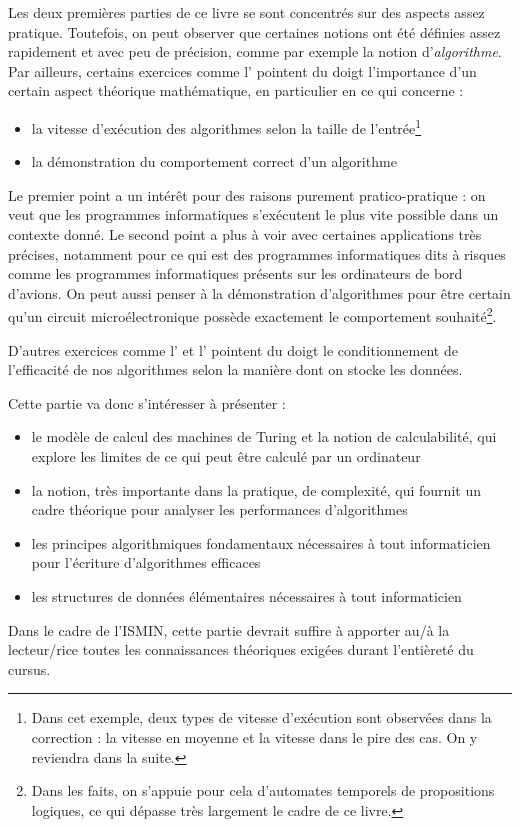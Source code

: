 \documentclass[../../main.tex]{subfiles}
\begin{document}
Les deux premières parties de ce livre se sont concentrés sur des aspects assez pratique. Toutefois, on peut observer que certaines notions ont été définies assez rapidement et avec peu de précision, comme par exemple la notion d'\textit{algorithme}. Par ailleurs, certains exercices comme l' pointent du doigt l'importance d'un certain aspect théorique mathématique, en particulier en ce qui concerne :
\begin{itemize}
	\item la vitesse d'exécution des algorithmes selon la taille de l'entrée\footnote{Dans cet exemple, deux types de vitesse d'exécution sont observées dans la correction : la vitesse en moyenne et la vitesse dans le pire des cas. On y reviendra dans la suite.}
	\item la démonstration du comportement correct d'un algorithme
\end{itemize}
Le premier point a un intérêt pour des raisons purement pratico-pratique : on veut que les programmes informatiques s'exécutent le plus vite possible dans un contexte donné. Le second point a plus à voir avec certaines applications très précises, notamment pour ce qui est des programmes informatiques dits \og à risques \fg comme les programmes informatiques présents sur les ordinateurs de bord d'avions. On peut aussi penser à la démonstration d'algorithmes pour être certain qu'un circuit microélectronique possède exactement le comportement souhaité\footnote{Dans les faits, on s'appuie pour cela d'automates temporels de propositions logiques, ce qui dépasse très largement le cadre de ce livre.}.

D'autres exercices comme l' et l' pointent du doigt le conditionnement de l'efficacité de nos algorithmes selon la manière dont on stocke les données.

Cette partie va donc s'intéresser à présenter :
\begin{itemize}
	\item le modèle de calcul des machines de Turing et la notion de calculabilité, qui explore les limites de ce qui peut être calculé par un ordinateur
	\item la notion, très importante dans la pratique, de complexité, qui fournit un cadre théorique pour analyser les performances d'algorithmes
	\item les principes algorithmiques fondamentaux nécessaires à tout informaticien pour l'écriture d'algorithmes efficaces
	\item les structures de données élémentaires nécessaires à tout informaticien
\end{itemize}
Dans le cadre de l'ISMIN, cette partie devrait suffire à apporter au/à la lecteur/rice toutes les connaissances théoriques exigées durant l'entièreté du cursus.
\end{document}
